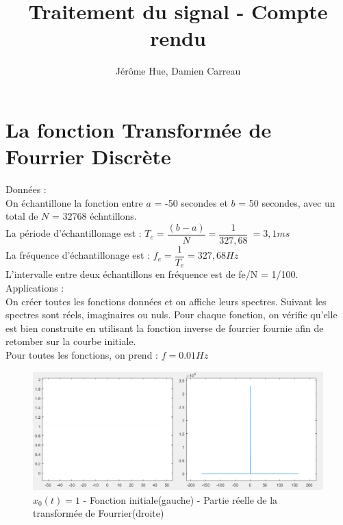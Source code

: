\documentclass[10pt,a4paper]{article}
\author{Jérôme Hue, Damien Carreau}
\title{Traitement du signal - Compte rendu}
\begin{document}
\maketitle
\section{La fonction Transformée de Fourrier Discrète}
\noindent
Données : \\
On échantillone la fonction entre $a$  = -50 secondes et $b$ = 50 secondes, avec un total de $N$ = 32768 échntillons.\\
La période d'échantillonage est : \( T_e = \dfrac{(b-a)}{N} = \dfrac{1}{327,68} \ = 3,1 ms \)  \\
La fréquence d'échantillonage est : \( f_e = \dfrac{1}{T_e} = 327,68 Hz \) \\
L'intervalle entre deux échantillons en fréquence est de fe/N = 1/100.\\

\noindent
Applications : \\
On créer toutes les fonctions données et on affiche leurs spectres. Suivant les spectres sont réels, imaginaires ou nuls.
Pour chaque fonction, on vérifie qu'elle est bien construite en utilisant la fonction inverse de fourrier fournie afin de retomber sur la courbe initiale.\\

Pour toutes les fonctions, on prend : $f = 0.01 Hz$\\


\begin{figure}[h]
\begin{center}
\includegraphics[scale=0.7]{x0.png}
\caption{$x_0(t) = 1$ - Fonction initiale(gauche) - Partie réelle de la transformée de Fourrier(droite)}
\end{center}
\end{figure} 
\end{document}
